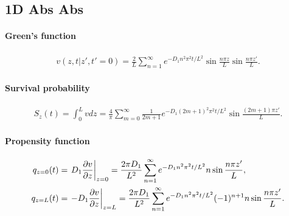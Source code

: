 
\subsection{1D Abs Abs}

\paragraph{Green's function}
\begin{align}
  v(z,t|z',t'=0) = \frac{2}{L}\sum_{n=1}^{\infty}
  e^{-D_1n^2\pi^2t/L^2} \sin\frac{n\pi z}{L} \sin\frac{n\pi z'}{L}.
\end{align}

\paragraph{Survival probability}
\begin{align}
  S_z(t) = \int_0^L v dz = \frac{4}{\pi} \sum_{m=0}^{\infty} \frac{1}{2m+1}
  e^{-D_1(2m+1)^2\pi^2t/L^2} \sin\frac{(2m+1)\pi z'}{L}.
\end{align}

\paragraph{Propensity function}
\begin{align}
  q_{z=0}(t) &= \left.D_1 \frac{\partial v}{\partial z}\right|_{z=0} = \frac{2\pi D_1}{L^2} 
  \sum_{n=1}^{\infty} e^{-D_1n^2\pi^2t/L^2} n \sin\frac{n\pi z'}{L},\\
  q_{z=L}(t) &= \left.- D_1 \frac{\partial v}{\partial z}\right|_{z=L} = \frac{2\pi D_1}{L^2} 
  \sum_{n=1}^{\infty} e^{-D_1n^2\pi^2t/L^2} (-1)^{n+1} n \sin\frac{n\pi 
  z'}{L}.
\end{align}

